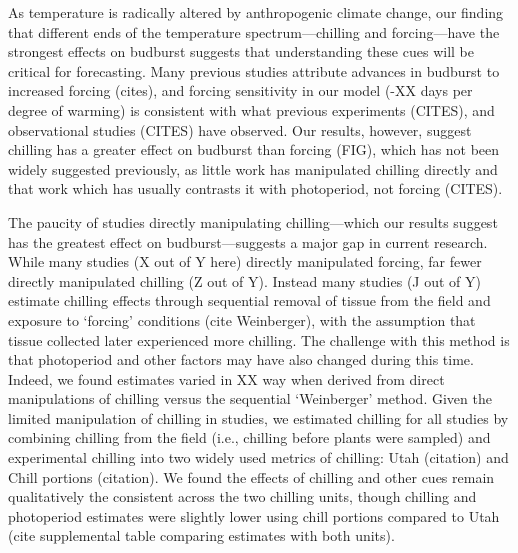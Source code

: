 \documentclass[11pt,letter]{article}
\begin{document}
\par As temperature is radically altered by anthropogenic climate change, our finding that different ends of the temperature spectrum---chilling and forcing---have the strongest effects on budburst suggests that understanding these cues will be critical for forecasting. Many previous studies attribute advances in budburst to increased forcing (cites), and forcing sensitivity in our model (-XX days per degree of warming) is consistent with what previous experiments (CITES), and observational studies (CITES) have observed. Our results, however, suggest chilling has a greater effect on budburst than forcing (FIG), which has not been widely suggested previously, as little work has manipulated chilling directly and that work which has usually contrasts it with photoperiod, not forcing (CITES). 

\par The paucity of studies directly manipulating chilling---which our results suggest has the greatest effect on budburst---suggests a major gap in current research. While many studies (X out of Y here) directly manipulated forcing, far fewer directly manipulated chilling (Z out of Y). Instead many studies (J out of Y) estimate chilling effects through sequential removal of tissue from the field and exposure to `forcing' conditions (cite Weinberger), with the assumption that tissue collected later experienced more chilling. The challenge with this method is that photoperiod and other factors may have also changed during this time. Indeed, we found estimates varied in XX way when derived from direct manipulations of chilling versus the sequential `Weinberger' method. Given the limited manipulation of chilling in studies, we estimated chilling for all studies by combining chilling from the field (i.e., chilling before plants were sampled) and experimental chilling into two widely used metrics of chilling: Utah (citation) and Chill portions (citation). We found the effects of chilling and other cues remain qualitatively the consistent across the two chilling units, though chilling and photoperiod estimates were slightly lower using chill portions compared to Utah (cite supplemental table comparing estimates with both units).  %

\end{document}
